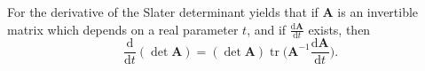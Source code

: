 For the derivative of the Slater determinant yields that if $\mathbf A$ is an invertible matrix which depends on a real parameter $t$, and if $\frac{\mathrm d\mathbf A}{\mathrm dt}$ exists, then\cite{Slattery,matrix2008} 
$$
\frac{\mathrm d}{\mathrm dt}(\det\mathbf A)=(\det\mathbf A)\mathop{\textrm{tr}}\biggl(\mathbf A^{-1}\frac{\mathrm d\mathbf A}{\mathrm dt}\biggr).
$$



